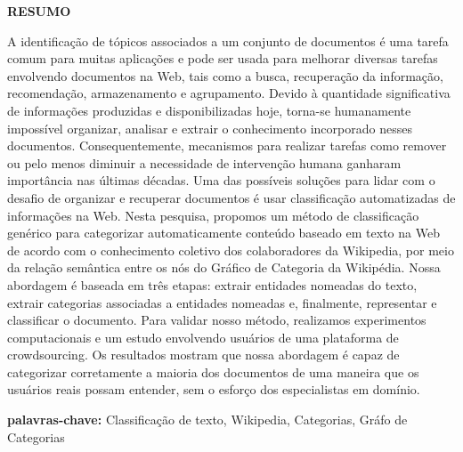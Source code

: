 \begin{center}
    \textbf{RESUMO}
    \vspace{40pt}
\end{center}

A identificação de tópicos associados a um conjunto de documentos é uma tarefa comum para muitas aplicações e pode ser usada para melhorar diversas tarefas envolvendo documentos na Web, tais como a busca, recuperação da informação, recomendação, armazenamento e agrupamento. Devido à quantidade significativa de informações produzidas e disponibilizadas hoje, torna-se humanamente impossível organizar, analisar e extrair o conhecimento incorporado nesses documentos. Consequentemente, mecanismos para realizar tarefas como remover ou pelo menos diminuir a necessidade de intervenção humana ganharam importância nas últimas décadas. Uma das possíveis soluções para lidar com o desafio de organizar e recuperar documentos é usar classificação automatizadas de informações na Web. Nesta pesquisa, propomos um método de classificação genérico para categorizar automaticamente conteúdo baseado em texto na Web de acordo com o conhecimento coletivo dos colaboradores da Wikipedia, por meio da relação semântica entre os nós do Gráfico de Categoria da Wikipédia. Nossa abordagem é baseada em três etapas: extrair entidades nomeadas do texto, extrair categorias associadas a entidades nomeadas e, finalmente, representar e classificar o documento. Para validar nosso método, realizamos experimentos computacionais e um estudo envolvendo usuários de uma plataforma de crowdsourcing. Os resultados mostram que nossa abordagem é capaz de categorizar corretamente a maioria dos documentos de uma maneira que os usuários reais possam entender, sem o esforço dos especialistas em domínio.
\vspace{20pt}

\textbf{palavras-chave:} Classificação de texto, Wikipedia, Categorias, Gráfo de Categorias
